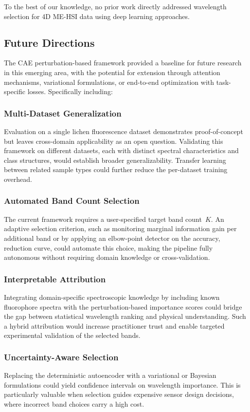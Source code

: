 To the best of our knowledge, no prior work directly addressed wavelength selection for 4D ME-HSI data using deep learning approaches.


\subsection{Future Directions}
\label{sec:future_work}

The CAE perturbation-based framework provided a baseline for future research in this emerging area, with the potential for extension through attention mechanisms, variational formulations, or end-to-end optimization with task-specific losses. Specifically including: 
\subsubsection{Multi-Dataset Generalization}
Evaluation on a single lichen fluorescence dataset demonstrates
proof-of-concept but leaves cross-domain applicability as an open question.
Validating this framework on different datasets, each with distinct spectral
characteristics and class structures, would establish broader
generalizability. Transfer learning between related sample types could
further reduce the per-dataset training overhead.

\subsubsection{Automated Band Count Selection}
The current framework requires a user-specified target band count~$K$.
An adaptive selection criterion, such as monitoring marginal information
gain per additional band or by applying an elbow-point detector on the
accuracy, reduction curve, could
automate this choice, making the pipeline fully autonomous without
requiring domain knowledge or cross-validation.

\subsubsection{Interpretable Attribution}
Integrating domain-specific spectroscopic knowledge by including known fluorophore spectra with the perturbation-based importance scores could bridge the gap between statistical wavelength ranking and physical understanding. Such a hybrid attribution would increase practitioner trust and enable targeted experimental validation of the selected bands.

\subsubsection{Uncertainty-Aware Selection}
Replacing the deterministic autoencoder with a variational or Bayesian
formulations could yield confidence intervals on wavelength importance.
This is particularly valuable when selection guides expensive sensor design
decisions, where incorrect band choices carry a high cost.